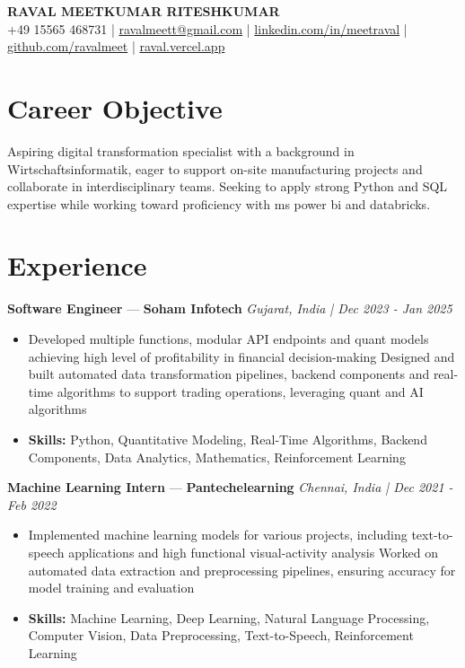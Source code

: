 \documentclass[a4paper,10pt]{article}
\begin{document}
\begin{center}
  {\Large\bfseries RAVAL MEETKUMAR RITESHKUMAR}\\[2pt]
  {\small +49 15565 468731 \;|\; \href{mailto:ravalmeett@gmail.com}{ravalmeett@gmail.com} \;|\; \href{https://www.linkedin.com/in/meetraval/}{linkedin.com/in/meetraval} \;|\; \href{https://github.com/ravalmeet}{github.com/ravalmeet} \;|\; \href{https://raval.vercel.app/}{raval.vercel.app}}
\end{center}
\vspace{-3pt}

\section*{Career Objective}
Aspiring digital transformation specialist with a background in Wirtschaftsinformatik, eager to support on-site manufacturing projects and collaborate in interdisciplinary teams. Seeking to apply strong Python and SQL expertise while working toward proficiency with ms power bi and databricks.\par

\section*{Experience}
\textbf{Software Engineer} — \textbf{Soham Infotech} \hfill \textit{Gujarat, India \;|\; Dec 2023 - Jan 2025}\par
\vspace{1pt}
\begin{itemize}
  \item Developed multiple functions, modular API endpoints and quant models achieving high level of profitability in financial decision-making Designed and built automated data transformation pipelines, backend components and real-time algorithms to support trading operations, leveraging quant and AI algorithms
  \item \textbf{Skills:} Python, Quantitative Modeling, Real-Time Algorithms, Backend Components, Data Analytics, Mathematics, Reinforcement Learning
\end{itemize}
\vspace{3pt}
\textbf{Machine Learning Intern} — \textbf{Pantechelearning} \hfill \textit{Chennai, India \;|\; Dec 2021 - Feb 2022}\par
\vspace{1pt}
\begin{itemize}
  \item Implemented machine learning models for various projects, including text-to-speech applications and high functional visual-activity analysis Worked on automated data extraction and preprocessing pipelines, ensuring accuracy for model training and evaluation
  \item \textbf{Skills:} Machine Learning, Deep Learning, Natural Language Processing, Computer Vision, Data Preprocessing, Text-to-Speech, Reinforcement Learning
\end{itemize}
\end{document}
